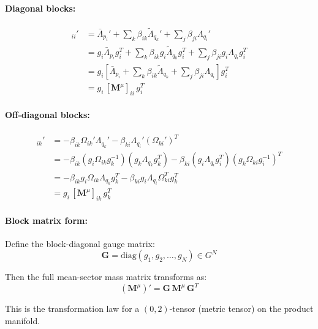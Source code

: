 \documentclass[12pt]{article}
\begin{document}
\paragraph{Diagonal blocks:}
\begin{align}
[\mathbf{M}^\mu]_{ii}' &= \bar{\Lambda}_{p_i}' + \sum_k \beta_{ik}\tilde{\Lambda}_{q_k}' + \sum_j \beta_{ji}\Lambda_{q_i}' \nonumber\\
&= g_i\bar{\Lambda}_{p_i} g_i^T + \sum_k \beta_{ik} g_i\tilde{\Lambda}_{q_k} g_i^T + \sum_j \beta_{ji} g_i\Lambda_{q_i} g_i^T \nonumber\\
&= g_i \left[\bar{\Lambda}_{p_i} + \sum_k \beta_{ik}\tilde{\Lambda}_{q_k} + \sum_j \beta_{ji}\Lambda_{q_i}\right] g_i^T \nonumber\\
&= g_i \, [\mathbf{M}^\mu]_{ii} \, g_i^T
\end{align}

\paragraph{Off-diagonal blocks:}
\begin{align}
[\mathbf{M}^\mu]_{ik}' &= -\beta_{ik}\Omega_{ik}'\Lambda_{q_k}' - \beta_{ki}\Lambda_{q_i}'(\Omega_{ki}')^T \nonumber\\
&= -\beta_{ik}(g_i\Omega_{ik}g_k^{-1})(g_k\Lambda_{q_k} g_k^T) - \beta_{ki}(g_i\Lambda_{q_i} g_i^T)(g_k\Omega_{ki}g_i^{-1})^T \nonumber\\
&= -\beta_{ik} g_i\Omega_{ik}\Lambda_{q_k} g_k^T - \beta_{ki} g_i\Lambda_{q_i}\Omega_{ki}^T g_k^T \nonumber\\
&= g_i \, [\mathbf{M}^\mu]_{ik} \, g_k^T
\end{align}

\paragraph{Block matrix form:}

Define the block-diagonal gauge matrix:
\begin{equation}
\mathbf{G} = \mathrm{diag}(g_1, g_2, \ldots, g_N) \in G^N
\end{equation}

Then the full mean-sector mass matrix transforms as:
\begin{equation}
\boxed{(\mathbf{M}^\mu)' = \mathbf{G} \, \mathbf{M}^\mu \, \mathbf{G}^T}
\end{equation}

This is the transformation law for a $(0,2)$-tensor (metric tensor) on the product manifold.
\end{document}
